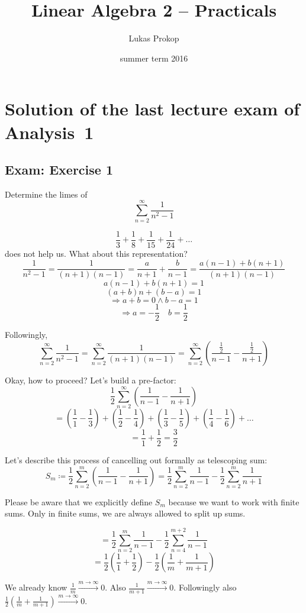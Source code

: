 \documentclass[a4paper]{article}
\title{Linear Algebra 2 -- Practicals}
\author{Lukas Prokop}
\date{summer term 2016}
\theoremstyle{definition}
\begin{document}
\maketitle
\tableofcontents

\section{Solution of the last lecture exam of Analysis~1}
\subsection{Exam: Exercise 1}
\begin{ex}
  Determine the limes of
  \[ \sum_{n=2}^\infty \frac{1}{n^2 - 1} \]
\end{ex}

\[ \frac{1}{3} + \frac{1}{8} + \frac{1}{15} + \frac{1}{24} + \ldots \]
does not help us. What about this representation?
\[ \frac{1}{n^2-1} = \frac{1}{(n+1)(n-1)} = \frac{a}{n+1} + \frac{b}{n-1} = \frac{a(n-1) + b(n+1)}{(n+1)(n-1)} \]
\[ a(n-1) + b(n+1) = 1 \]
\[ (a + b)n + (b-a) = 1 \]
\[ \Rightarrow a + b = 0 \land b - a = 1 \]
\[ \Rightarrow a = -\frac12 \quad b = \frac12 \]

Followingly,
\[ \sum_{n=2}^\infty \frac{1}{n^2 - 1} = \sum_{n=2}^\infty \frac{1}{(n+1)(n-1)} = \sum_{n=2}^\infty \left(\frac{\frac12}{n-1} - \frac{\frac12}{n+1}\right) \]

Okay, how to proceed? Let's build a pre-factor:
\[ \frac12 \sum_{n=2}^\infty \left(\frac{1}{n-1} - \frac{1}{n+1}\right) \]
\[ = \left(\frac11 - \frac13\right) + \left(\frac12 - \frac14\right) + \left(\frac13 - \frac15\right) + \left(\frac14 - \frac16\right) + \ldots \]
\[ = \frac11 + \frac12 = \frac32 \]

Let's describe this process of cancelling out formally as telescoping sum:
\[
  S_m \coloneqq \frac12 \sum_{n=2}^m \left(\frac1{n-1} - \frac1{n+1}\right)
  = \frac12 \sum_{n=2}^m \frac{1}{n-1} - \frac12 \sum_{n=2}^m \frac{1}{n+1}
\]

Please be aware that we explicitly define $S_m$ because we want to work with finite sums.
Only in finite sums, we are always allowed to split up sums.

\[ = \frac12 \sum_{n=2}^m \frac{1}{n-1} - \frac12 \sum_{n=4}^{m+2} \frac{1}{n-1} \]
\[ = \frac12 \left(\frac11 + \frac12\right) - \frac12 \left(\frac1m + \frac1{m+1}\right) \]

We already know $\frac1m \xrightarrow{m\to\infty} 0$. Also $\frac1{m+1} \xrightarrow{m\to\infty} 0$.
Followingly also $\frac12 \left(\frac1m + \frac1{m+1}\right) \xrightarrow{m\to\infty} 0$.
\end{document}

